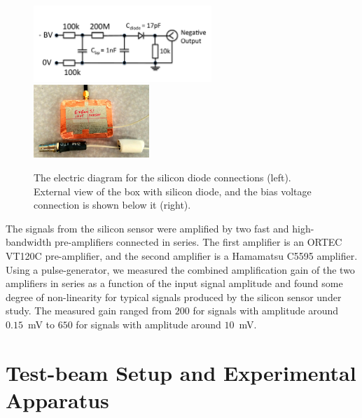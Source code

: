 \documentclass[12pt]{article}
\begin{document}
{\begin{figure}[htbp] 
\centering
\includegraphics[width=0.60\textwidth]{plots/SiliconDiodeDiagram.pdf} 
\includegraphics[width=0.39\textwidth]{plots/SiliconDiodeBox.jpg} 
\caption{The electric diagram for the silicon diode connections (left). External
view of the box with silicon diode, and the bias voltage connection is shown
below it (right).} 
\label{fig:SiliconPad} 
\end{figure} 

The signals from the silicon sensor were amplified by two fast and
high-bandwidth pre-amplifiers connected in series. The first amplifier is an
ORTEC VT120C pre-amplifier, and the second amplifier is a Hamamatsu C5595
amplifier. Using a pulse-generator, we measured the combined amplification gain
of the two amplifiers in series as a function of the input signal amplitude and
found some degree of non-linearity for typical signals produced by the silicon
sensor under study. The measured gain ranged from $200$ for signals with
amplitude around $0.15$~mV to $650$ for signals with amplitude around $10$~mV.

\section{Test-beam Setup and Experimental Apparatus }
\label{sec:tbeam}

}
\end{document}
